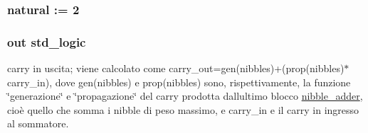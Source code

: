 \subsubsection[{\texorpdfstring{nibble\+\_\+adder}{nibble_adder}}]{ {\bfseries \textcolor{vhdlchar}{ }} \hspace{0.3cm}{\ttfamily [Component]}}\hypertarget{group___carry_loockahead_ga98a3a5b152caf0f2de1e31ac60088369}{}\label{group___carry_loockahead_ga98a3a5b152caf0f2de1e31ac60088369}
\subsubsection[{\texorpdfstring{nibbles}{nibbles}}]{ {\bfseries \textcolor{vhdlchar}{ }} {\bfseries \textcolor{vhdlchar}{natural}\textcolor{vhdlchar}{ }\textcolor{vhdlchar}{ }\textcolor{vhdlchar}{\+:}\textcolor{vhdlchar}{=}\textcolor{vhdlchar}{ }\textcolor{vhdlchar}{ } \textcolor{vhdldigit}{2} \textcolor{vhdlchar}{ }} \hspace{0.3cm}{\ttfamily [Generic]}}\hypertarget{group___carry_loockahead_ga0b63b586531492d0fa882246cca071c1}{}\label{group___carry_loockahead_ga0b63b586531492d0fa882246cca071c1}
\subsubsection[{\texorpdfstring{overflow}{overflow}}]{ {\bfseries \textcolor{vhdlchar}{out}\textcolor{vhdlchar}{ }} {\bfseries \textcolor{vhdlchar}{std\+\_\+logic}\textcolor{vhdlchar}{ }} \hspace{0.3cm}{\ttfamily [Port]}}\hypertarget{group___carry_loockahead_ga9650307dde287e0bcfa1e26370c006c2}{}\label{group___carry_loockahead_ga9650307dde287e0bcfa1e26370c006c2}
carry in uscita; viene calcolato come carry\+\_\+out=gen(nibbles)+(prop(nibbles)$\ast$carry\+\_\+in), dove gen(nibbles) e prop(nibbles) sono, rispettivamente, la funzione \char`\"{}generazione\char`\"{} e \char`\"{}propagazione\char`\"{} del carry prodotta dall\textquotesingle{}ultimo blocco \hyperlink{classnibble__adder}{nibble\+\_\+adder}, cioè quello che somma i nibble di peso massimo, e carry\+\_\+in e\textquotesingle{} il carry in ingresso al sommatore. 
